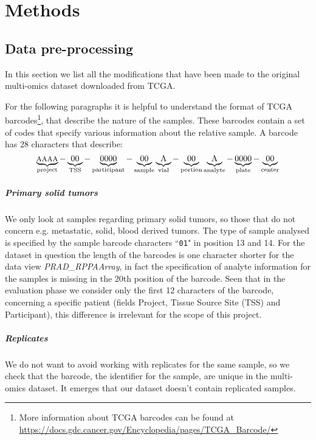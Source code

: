 \chapter{Methods}
\section{Data pre-processing}
In this section we list all the modifications that have been made to the original multi-omics dataset downloaded from TCGA.\newline

For the following paragraphs it is helpful to understand the format of TCGA barcodes\footnote{More information about TCGA barcodes can be found at \url{https://docs.gdc.cancer.gov/Encyclopedia/pages/TCGA_Barcode/}}, that describe the nature of the samples. These barcodes contain a set of codes that specify various information about the relative sample. A barcode has 28 characters that describe:
\begin{equation*}
    \underbrace{\text{\footnotesize AAAA}}_\text{project}-
    \underbrace{\text{00}}_\text{TSS}-
    \underbrace{\text{0000}}_\text{participant}-
    \underbrace{\text{00}}_\text{sample}
    \underbrace{\text{A}}_\text{vial}-
    \underbrace{\text{00}}_\text{portion}
    \underbrace{\text{A}}_\text{analyte}-
    \underbrace{\text{0000}}_\text{plate}-
    \underbrace{\text{00}}_\text{center}
\end{equation*}
\paragraph{Primary solid tumors}
We only look at samples regarding primary solid tumors, so those that do not concern e.g. metastatic, solid, blood derived tumors. The type of sample analysed is specified by the sample barcode characters ``\texttt{01}" in position 13 and 14.
For the dataset in question the length of the barcodes is one character shorter for the data view \textit{PRAD\_RPPAArray}, in fact the specification of analyte information for the samples is missing in the 20th position of the barcode. Seen that in the evaluation phase we consider only the first 12 characters of the barcode, concerning a specific patient (fields Project, Tissue Source Site (TSS) and Participant), this difference is irrelevant for the scope of this project.
\paragraph{Replicates} We do not want to avoid working with replicates for the same sample, so we check that the barcode, the identifier for the sample, are unique in the multi-omics dataset. It emerges that our dataset doesn't contain replicated samples.
